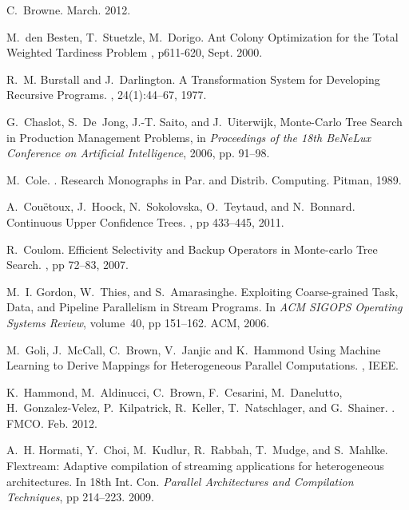 \documentclass[smallextended]{svjour3}
\begin{document}
\begin{thebibliography}{}
C.~Browne.
 March. 2012.

M.~den Besten, T.~Stuetzle, M.~Dorigo.
\newblock Ant Colony Optimization for the Total Weighted Tardiness
Problem
, p611-620, Sept. 2000.

R.~M. Burstall and J.~Darlington.
\newblock A {T}ransformation {S}ystem for {D}eveloping {R}ecursive {P}rograms.
, 24(1):44--67, 1977.

G.~Chaslot, S.~De~Jong, J.-T. Saito, and J.~Uiterwijk, Monte-Carlo Tree
 Search in Production Management Problems, in \emph{Proceedings of the 18th
 BeNeLux Conference on Artificial Intelligence}, 2006, pp. 91--98.
 
M.~Cole.
.
\newblock Research Monographs in Par. and Distrib. Computing. Pitman, 1989.
 
A.~Cou{\"e}toux, J.~Hoock, N.~Sokolovska, O.~Teytaud, and N.~Bonnard.
\newblock Continuous Upper Confidence Trees.
, pp 433--445, 2011.

R.~Coulom.
\newblock Efficient Selectivity and Backup Operators in Monte-carlo Tree
  Search.
, pp 72--83, 2007.

M.~I. Gordon, W.~Thies, and S.~Amarasinghe.
\newblock Exploiting Coarse-grained Task, Data, and Pipeline Parallelism in
  Stream Programs.
\newblock In {\em ACM SIGOPS Operating Systems Review}, volume~40, pp
  151--162. ACM, 2006.

M.~Goli, J.~McCall, C.~Brown, V.~Janjic and K.~Hammond
\newblock Using Machine Learning to Derive Mappings for Heterogeneous Parallel Computations.
, IEEE.

K.~Hammond, M.~Aldinucci, C.~Brown, F.~Cesarini, M.~Danelutto,
  H.~Gonzalez-Velez, P.~Kilpatrick, R.~Keller, T.~Natschlager, and G.~Shainer.
.
\newblock FMCO. Feb. 2012.

A.~H. Hormati, Y.~Choi, M.~Kudlur, R.~Rabbah, T.~Mudge, and S.~Mahlke.
\newblock Flextream: Adaptive compilation of streaming applications for
  heterogeneous architectures.
\newblock In {18th Int. Con. \em Parallel Architectures and Compilation Techniques}, pp 214--223. 2009.


\end{thebibliography}
\end{document}
